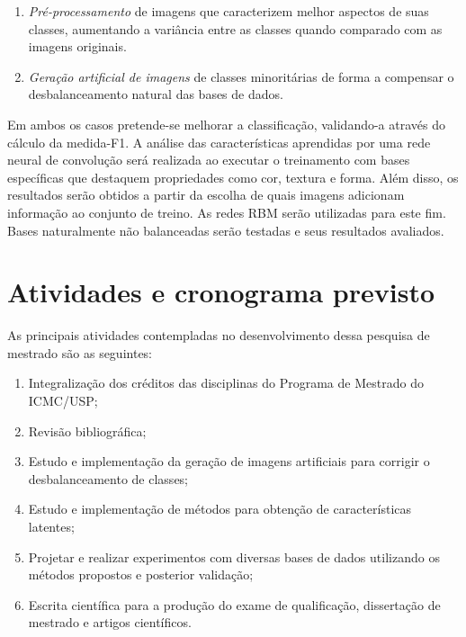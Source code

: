 \begin{enumerate}
 \item \textit{Pré-processamento} de imagens que caracterizem melhor aspectos de suas classes, aumentando a variância entre as classes quando comparado com as imagens originais.
 \item \textit{Geração artificial de imagens} de classes minoritárias de forma a compensar o desbalanceamento natural das bases de dados.
\end{enumerate}

Em ambos os casos pretende-se melhorar a classificação, validando-a através do cálculo da medida-F1. A análise das características aprendidas por uma rede neural de convolução será realizada ao executar o treinamento com bases específicas que destaquem propriedades como cor, textura e forma. Além disso, os resultados serão obtidos a partir da escolha de quais imagens adicionam informação ao conjunto de treino. As redes RBM serão utilizadas para este fim. Bases naturalmente não balanceadas serão testadas e seus resultados avaliados.

\section{Atividades e cronograma previsto}

As principais atividades contempladas no desenvolvimento dessa pesquisa de mestrado são as seguintes:

\begin{enumerate}
 \item Integralização dos créditos das disciplinas do Programa de Mestrado do ICMC/USP;
 \item Revisão bibliográfica;
 \item Estudo e implementação da geração de imagens artificiais para corrigir o desbalanceamento de classes;
 \item Estudo e implementação de métodos para obtenção de características latentes;
 \item Projetar e realizar experimentos com diversas bases de dados utilizando os métodos propostos e posterior validação;
 \item Escrita científica para a produção do exame de qualificação, dissertação de mestrado e artigos científicos.
\end{enumerate}

